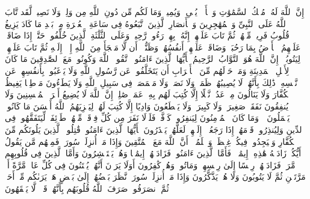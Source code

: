 \startbuffer[\q:9:116]
إِنَّ ٱللَّهَ لَهُۥ مُلۡكُ ٱلسَّمَٰوَٰتِ وَٱلۡأَرۡضِۖ یُحۡیِۦ وَیُمِیتُۚ وَمَا لَكُم مِّن دُونِ ٱللَّهِ مِن وَلِیࣲّ وَلَا نَصِیرࣲ%
\stopbuffer
\startbuffer[\q:9:117]
لَّقَد تَّابَ ٱللَّهُ عَلَى ٱلنَّبِیِّ وَٱلۡمُهَٰجِرِینَ وَٱلۡأَنصَارِ ٱلَّذِینَ ٱتَّبَعُوهُ فِی سَاعَةِ ٱلۡعُسۡرَةِ مِنۢ بَعۡدِ مَا كَادَ یَزِیغُ قُلُوبُ فَرِیقࣲ مِّنۡهُمۡ ثُمَّ تَابَ عَلَیۡهِمۡۚ إِنَّهُۥ بِهِمۡ رَءُوفࣱ رَّحِیمࣱ%
\stopbuffer
\startbuffer[\q:9:118]
وَعَلَى ٱلثَّلَٰثَةِ ٱلَّذِینَ خُلِّفُوا۟ حَتَّىٰۤ إِذَا ضَاقَتۡ عَلَیۡهِمُ ٱلۡأَرۡضُ بِمَا رَحُبَتۡ وَضَاقَتۡ عَلَیۡهِمۡ أَنفُسُهُمۡ وَظَنُّوۤا۟ أَن لَّا مَلۡجَأَ مِنَ ٱللَّهِ إِلَّاۤ إِلَیۡهِ ثُمَّ تَابَ عَلَیۡهِمۡ لِیَتُوبُوۤا۟ۚ إِنَّ ٱللَّهَ هُوَ ٱلتَّوَّابُ ٱلرَّحِیمُ%
\stopbuffer
\startbuffer[\q:9:119]
یَٰۤأَیُّهَا ٱلَّذِینَ ءَامَنُوا۟ ٱتَّقُوا۟ ٱللَّهَ وَكُونُوا۟ مَعَ ٱلصَّٰدِقِینَ%
\stopbuffer
\startbuffer[\q:9:120]
مَا كَانَ لِأَهۡلِ ٱلۡمَدِینَةِ وَمَنۡ حَوۡلَهُم مِّنَ ٱلۡأَعۡرَابِ أَن یَتَخَلَّفُوا۟ عَن رَّسُولِ ٱللَّهِ وَلَا یَرۡغَبُوا۟ بِأَنفُسِهِمۡ عَن نَّفۡسِهِۦۚ ذَٰلِكَ بِأَنَّهُمۡ لَا یُصِیبُهُمۡ ظَمَأࣱ وَلَا نَصَبࣱ وَلَا مَخۡمَصَةࣱ فِی سَبِیلِ ٱللَّهِ وَلَا یَطَءُونَ مَوۡطِئࣰا یَغِیظُ ٱلۡكُفَّارَ وَلَا یَنَالُونَ مِنۡ عَدُوࣲّ نَّیۡلًا إِلَّا كُتِبَ لَهُم بِهِۦ عَمَلࣱ صَٰلِحٌۚ إِنَّ ٱللَّهَ لَا یُضِیعُ أَجۡرَ ٱلۡمُحۡسِنِینَ%
\stopbuffer
\startbuffer[\q:9:121]
وَلَا یُنفِقُونَ نَفَقَةࣰ صَغِیرَةࣰ وَلَا كَبِیرَةࣰ وَلَا یَقۡطَعُونَ وَادِیًا إِلَّا كُتِبَ لَهُمۡ لِیَجۡزِیَهُمُ ٱللَّهُ أَحۡسَنَ مَا كَانُوا۟ یَعۡمَلُونَ%
\stopbuffer
\startbuffer[\q:9:122]
۞ وَمَا كَانَ ٱلۡمُؤۡمِنُونَ لِیَنفِرُوا۟ كَاۤفَّةࣰۚ فَلَوۡلَا نَفَرَ مِن كُلِّ فِرۡقَةࣲ مِّنۡهُمۡ طَاۤئِفَةࣱ لِّیَتَفَقَّهُوا۟ فِی ٱلدِّینِ وَلِیُنذِرُوا۟ قَوۡمَهُمۡ إِذَا رَجَعُوۤا۟ إِلَیۡهِمۡ لَعَلَّهُمۡ یَحۡذَرُونَ%
\stopbuffer
\startbuffer[\q:9:123]
یَٰۤأَیُّهَا ٱلَّذِینَ ءَامَنُوا۟ قَٰتِلُوا۟ ٱلَّذِینَ یَلُونَكُم مِّنَ ٱلۡكُفَّارِ وَلۡیَجِدُوا۟ فِیكُمۡ غِلۡظَةࣰۚ وَٱعۡلَمُوۤا۟ أَنَّ ٱللَّهَ مَعَ ٱلۡمُتَّقِینَ%
\stopbuffer
\startbuffer[\q:9:124]
وَإِذَا مَاۤ أُنزِلَتۡ سُورَةࣱ فَمِنۡهُم مَّن یَقُولُ أَیُّكُمۡ زَادَتۡهُ هَٰذِهِۦۤ إِیمَٰنࣰاۚ فَأَمَّا ٱلَّذِینَ ءَامَنُوا۟ فَزَادَتۡهُمۡ إِیمَٰنࣰا وَهُمۡ یَسۡتَبۡشِرُونَ%
\stopbuffer
\startbuffer[\q:9:125]
وَأَمَّا ٱلَّذِینَ فِی قُلُوبِهِم مَّرَضࣱ فَزَادَتۡهُمۡ رِجۡسًا إِلَىٰ رِجۡسِهِمۡ وَمَاتُوا۟ وَهُمۡ كَٰفِرُونَ%
\stopbuffer
\startbuffer[\q:9:126]
أَوَلَا یَرَوۡنَ أَنَّهُمۡ یُفۡتَنُونَ فِی كُلِّ عَامࣲ مَّرَّةً أَوۡ مَرَّتَیۡنِ ثُمَّ لَا یَتُوبُونَ وَلَا هُمۡ یَذَّكَّرُونَ%
\stopbuffer
\startbuffer[\q:9:127]
وَإِذَا مَاۤ أُنزِلَتۡ سُورَةࣱ نَّظَرَ بَعۡضُهُمۡ إِلَىٰ بَعۡضٍ هَلۡ یَرَىٰكُم مِّنۡ أَحَدࣲ ثُمَّ ٱنصَرَفُوا۟ۚ صَرَفَ ٱللَّهُ قُلُوبَهُم بِأَنَّهُمۡ قَوۡمࣱ لَّا یَفۡقَهُونَ%
